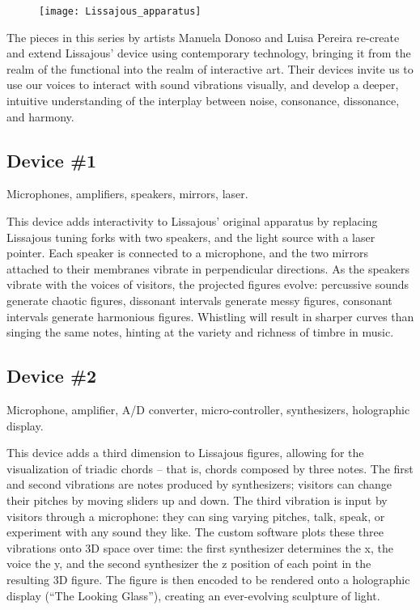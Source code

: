 \begin{figure}[!h]
\centering
\texttt{[image: Lissajous\_apparatus]}
\end{figure}


The pieces in this series by artists Manuela Donoso and Luisa Pereira re-create and extend Lissajous' device using contemporary technology, bringing it from the realm of the functional into the realm of interactive art. Their devices invite us to use our voices to interact with sound vibrations visually, and develop a deeper, intuitive understanding of the interplay between noise, consonance, dissonance, and harmony.



\subsection{Device \#1}
Microphones, amplifiers, speakers, mirrors, laser.

This device adds interactivity to Lissajous' original apparatus by replacing Lissajous tuning forks with two speakers, and the light source with a laser pointer. Each speaker is connected to a microphone, and the two mirrors attached to their membranes vibrate in perpendicular directions. As the speakers vibrate with the voices of visitors, the projected figures evolve: percussive sounds generate chaotic figures, dissonant intervals generate messy figures, consonant intervals generate harmonious figures. Whistling will result in sharper curves than singing the same notes, hinting at the variety and richness of timbre in music.

\subsection{Device \#2}
Microphone, amplifier, A/D converter, micro-controller, synthesizers, holographic display.

This device adds a third dimension to Lissajous figures, allowing for the visualization of triadic chords -- that is, chords composed by three notes. The first and second vibrations are notes produced by synthesizers; visitors can change their pitches by moving sliders up and down. The third vibration is input by visitors through a microphone: they can sing varying pitches, talk, speak, or experiment with any sound they like. The custom software plots these three vibrations onto 3D space over time: the first synthesizer determines the x, the voice the y, and the second synthesizer the z position of each point in the resulting 3D figure. The figure is then encoded to be rendered onto a holographic display (``The Looking Glass''), creating an ever-evolving sculpture of light.

